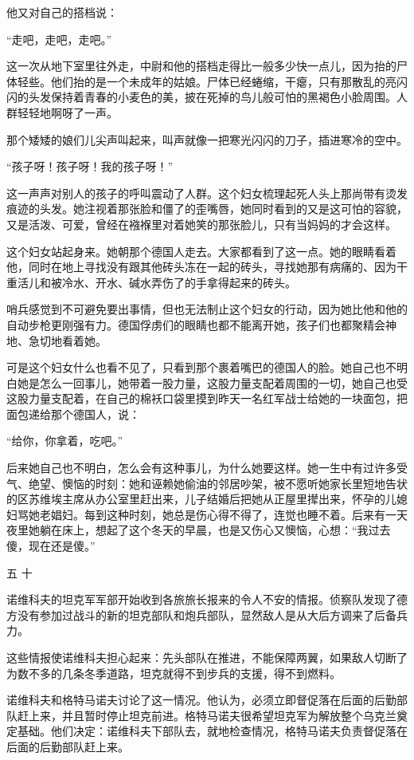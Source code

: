 他又对自己的搭档说：

“走吧，走吧，走吧。”

这一次从地下室里往外走，中尉和他的搭档走得比一般多少快一点儿，因为抬的尸体轻些。他们抬的是一个未成年的姑娘。尸体已经蜷缩，干瘪，只有那散乱的亮闪闪的头发保持着青春的小麦色的美，披在死掉的鸟儿般可怕的黑褐色小脸周围。人群轻轻地啊呀了一声。

那个矮矮的娘们儿尖声叫起来，叫声就像一把寒光闪闪的刀子，插进寒冷的空中。

“孩子呀！孩子呀！我的孩子呀！”

这一声声对别人的孩子的呼叫震动了人群。这个妇女梳理起死人头上那尚带有烫发痕迹的头发。她注视着那张脸和僵了的歪嘴唇，她同时看到的又是这可怕的容貌，又是活泼、可爱，曾经在襁褓里对着她笑的那张脸儿，只有当妈妈的才会这样。

这个妇女站起身来。她朝那个德国人走去。大家都看到了这一点。她的眼睛看着他，同时在地上寻找没有跟其他砖头冻在一起的砖头，寻找她那有病痛的、因为干重活儿和被冷水、开水、碱水弄伤了的手拿得起来的砖头。

哨兵感觉到不可避免要出事情，但也无法制止这个妇女的行动，因为她比他和他的自动步枪更刚强有力。德国俘虏们的眼睛也都不能离开她，孩子们也都聚精会神地、急切地看着她。

可是这个妇女什么也看不见了，只看到那个裹着嘴巴的德国人的脸。她自己也不明白她是怎么一回事儿，她带着一股力量，这股力量支配着周围的一切，她自己也受这股力量支配着，在自己的棉袄口袋里摸到昨天一名红军战士给她的一块面包，把面包递给那个德国人，说：

“给你，你拿着，吃吧。”

后来她自己也不明白，怎么会有这种事儿，为什么她要这样。她一生中有过许多受气、绝望、懊恼的时刻：她和诬赖她偷油的邻居吵架，被不愿听她家长里短地告状的区苏维埃主席从办公室里赶出来，儿子结婚后把她从正屋里撵出来，怀孕的儿媳妇骂她老娼妇。每到这种时刻，她总是伤心得不得了，连觉也睡不着。后来有一天夜里她躺在床上，想起了这个冬天的早晨，也是又伤心又懊恼，心想：“我过去傻，现在还是傻。”

五 十

诺维科夫的坦克军军部开始收到各旅旅长报来的令人不安的情报。侦察队发现了德方没有参加过战斗的新的坦克部队和炮兵部队，显然敌人是从大后方调来了后备兵力。

这些情报使诺维科夫担心起来：先头部队在推进，不能保障两翼，如果敌人切断了为数不多的几条冬季道路，坦克就得不到步兵的支援，得不到燃料。

诺维科夫和格特马诺夫讨论了这一情况。他认为，必须立即督促落在后面的后勤部队赶上来，并且暂时停止坦克前进。格特马诺夫很希望坦克军为解放整个乌克兰奠定基础。他们决定：诺维科夫下部队去，就地检查情况，格特马诺夫负责督促落在后面的后勤部队赶上来。


